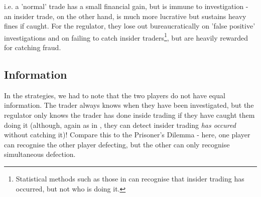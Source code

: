 \documentclass{article}
\begin{document}
i.e. a 'normal' trade has a small financial gain, but is immune to investigation - an insider trade, on the other hand, is much more lucrative but sustains heavy fines if caught. For the regulator, they lose out bureaucratically on 'false positive' investigations and on failing to catch insider traders\footnote{Statistical methods such as those in \citet{bris2005insider} can recognise that insider trading has occurred, but not who is doing it.}, but are heavily rewarded for catching fraud. 

\subsection{Information}
In the strategies, we had to note that the two players do not have equal information. The trader always knows when they have been investigated, but the regulator only knows the trader has done inside trading if they have caught them doing it (although, again as in \citet{bris2005insider}, they can detect insider trading \emph{has occured} without catching it)! Compare this to the Prisoner's Dilemma - here, one player can recognise the other player defecting, but the other can only recognise simultaneous defection.




\end{document}
